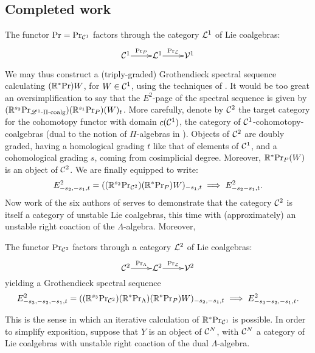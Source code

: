 \documentclass[11pt]{article}
\begin{document}
\subsection{Completed work}\label{Iterative-calculation}
\begin{prop}
The functor $\textup{Pr}=\textup{Pr}_{\mathcal{C}^1}$ factors through the category $\mathcal{L}^1$ of Lie coalgebras:
\[\xymatrix@R=4mm@1{
\calC^1\ar[r]^-{\textup{Pr}_P}
&%
\calL^1\ar[r]^-{\textup{Pr}_\calL}
&%
\calV^1%
}\]
\end{prop}
We may thus construct a (triply-graded) Grothendieck spectral sequence calculating $(\mathbb{R}^*\textup{Pr})W$, for $W\in\mathcal{C}^1$, using the techniques of \cite{Blanc_Stover-Groth_SS.pdf}. It would be too great an oversimplification to say that the $E^2$-page of the spectral sequence is given by $(\mathbb{R}^{s_2}\textup{Pr}_{\mathscr{L}^1\textup{-$\Pi$-coalg}})(\mathbb{R}^{s_1}\textup{Pr}_P)(W)_t$. 
More carefully, denote by $\mathcal{C}^2$ the target category for the cohomotopy functor with domain $c(\mathcal{C}^1)$, the category of $\mathcal{C}^1$-cohomotopy-coalgebras (dual to the notion of $\Pi$-algebras in \cite{Blanc_Stover-Groth_SS.pdf}). Objects of $\mathcal{C}^2$ are doubly graded, having a homological grading $t$ like that of elements of $\mathcal{C}^1$, and a cohomological grading $s$, coming from cosimplicial degree. Moreover, $\mathbb{R}^*\textup{Pr}_P(W)$ is an object of $\mathcal{C}^2$. We are finally equipped to write:
\[E^2_{-s_2,-s_1,t}=((\mathbb{R}^{s_2}\textup{Pr}_{\mathcal{C}^2})(\mathbb{R}^*\textup{Pr}_P)W)_{-s_1,t}\implies E^2_{-s_2-s_1,t}.\]
Now work of the six authors of \cite{6Author.pdf} serves to demonstrate that the category $\mathcal{C}^2$ is itself a category of unstable Lie coalgebras, this time with (approximately) an unstable right coaction of the $\Lambda$-algebra. Moreover,
\begin{prop}
The functor $\textup{Pr}_{\mathcal{C}^2}$ factors through a category $\mathcal{L}^2$ of Lie coalgebras:
\[\xymatrix@R=4mm@1{
\calC^2\ar[r]^-{\textup{Pr}_\Lambda}
&%
\calL^2\ar[r]^-{\textup{Pr}_\calL}
&%
\calV^2%
}\]
yielding a Grothendieck spectral sequence 
\[E^2_{-s_3,-s_2,-s_1,t}=((\mathbb{R}^{s_3}\textup{Pr}_{\mathcal{C}^2})(\mathbb{R}^*\textup{Pr}_\Lambda)(\mathbb{R}^*\textup{Pr}_P)W)_{-s_2,-s_1,t}\implies E^2_{-s_3-s_2,-s_1,t}.\]
\end{prop}
This is the sense in which an iterative calculation of $\mathbb{R}^*\textup{Pr}_{\mathcal{C}^1}$ is possible. In order to simplify exposition, suppose that $Y$ is an object of $\mathcal{C}^N$, with $\mathcal{C}^N$ a category of Lie coalgebras with unstable right coaction of the dual $\Lambda$-algebra. 
\end{document}
